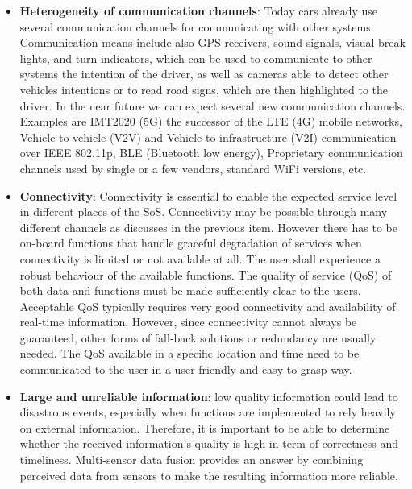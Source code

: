 \begin{itemize}
\item {\bf Heterogeneity of communication channels}: Today cars already use several communication channels  for communicating with other systems. Communication means include also GPS receivers, sound signals, visual break lights, and turn indicators, which can be used to communicate to other systems the intention of the driver, as well as cameras able to detect other vehicles intentions or to read road signs, which are then highlighted to the driver. In the near future we can expect several new communication channels. Examples are IMT2020 (5G) the successor of the LTE (4G) mobile networks, Vehicle to vehicle (V2V) and Vehicle to infrastructure (V2I) communication over IEEE 802.11p, BLE (Bluetooth low energy), Proprietary communication channels used by single or a few vendors, standard WiFi versions, etc.
\item {\bf Connectivity}: Connectivity is essential to enable the expected service level in different places of the SoS. Connectivity may be possible through many different channels as discusses in the previous item. However there has to be on-board functions that handle graceful degradation of services when connectivity is limited or not available at all. The user shall experience a robust behaviour of the available functions. The quality of service (QoS) of both data and functions must be made sufficiently clear to the users. Acceptable QoS typically requires very good connectivity and availability of real-time information. However, since connectivity cannot always be guaranteed, other forms of fall-back solutions or redundancy are usually needed. The QoS available in a specific location and time need to be communicated to the user in a user-friendly and  easy to grasp way.
\item {\bf Large and unreliable information}: low quality information could lead to disastrous events, especially when functions are implemented to rely heavily on external information. Therefore, it is important to be able to determine whether the received information's quality is high in term of correctness and timeliness. Multi-sensor data fusion provides an answer by combining perceived data from sensors to make the resulting information more reliable. 

\end{itemize}
